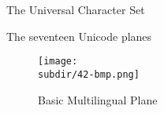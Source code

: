\documentclass[../index.tex]{subfiles}
\begin{document}
\renewcommand{\currenttitle}{The Universal Character Set}
\begin{frame}{\currenttitle}
%
%
%
\end{frame}

\renewcommand{\currenttitle}{The seventeen Unicode planes}
\begin{frame}{\currenttitle}
%
%
%
  \vspace*{1em}
  \begin{figure}
    \centering
    \texttt{[image: \\subdir/42-bmp.png]}
    \caption{Basic Multilingual Plane}
  \end{figure}
\end{frame}
\end{document}
